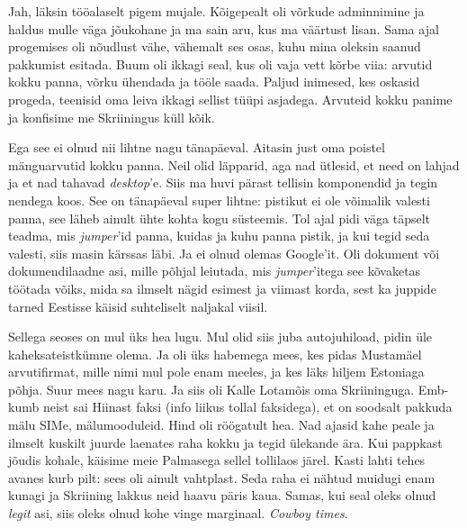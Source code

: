 
Jah, läksin tööalaselt 
pigem mujale. Kõigepealt oli võrkude adminnimine ja haldus mulle väga jõukohane ja ma sain aru, kus ma väärtust lisan. Sama ajal 
progemises oli nõudlust vähe, vähemalt ses osas, 
kuhu mina oleksin saanud pakkumist esitada. Buum oli ikkagi seal, kus 
oli vaja vett kõrbe viia: arvutid kokku panna, võrku ühendada ja
tööle saada. Paljud inimesed, kes 
oskasid progeda, teenisid oma leiva ikkagi sellist tüüpi asjadega. 
Arvuteid kokku panime ja konfisime me Skriiningus küll kõik. 

Ega see ei olnud nii lihtne nagu tänapäeval. Aitasin just oma poistel mänguarvutid kokku panna. 
Neil olid läpparid, aga nad ütlesid, et need on lahjad ja et nad tahavad \emph{desktop}'e. 
Siis ma huvi pärast tellisin komponendid ja tegin nendega koos. See on 
tänapäeval super lihtne: pistikut ei ole võimalik valesti 
panna, see läheb ainult ühte kohta kogu süsteemis. Tol ajal pidi väga 
täpselt teadma, mis \emph{jumper}'id panna, kuidas ja kuhu panna pistik, ja kui 
tegid seda valesti, siis masin kärssas läbi. Ja ei olnud olemas 
Google'it. Oli dokument või dokumendilaadne asi, mille põhjal leiutada, 
mis \emph{jumper}'itega see kõvaketas töötada võiks, mida sa ilmselt nägid 
esimest ja viimast korda, sest ka juppide tarned Eestisse käisid suhteliselt 
naljakal viisil. 


Sellega seoses on mul üks hea lugu. Mul olid siis juba autojuhiload, 
pidin üle kaheksateistkümne olema. Ja oli üks habemega 
mees, kes pidas Mustamäel arvutifirmat, mille nimi mul pole enam meeles, 
ja kes läks hiljem Estoniaga põhja. Suur mees nagu karu. 
Ja siis oli Kalle Lotamõis oma Skriininguga. Emb-kumb neist 
sai Hiinast faksi (info liikus tollal faksidega), et on soodsalt pakkuda mälu 
SIMe, mälumooduleid. Hind oli röögatult hea. Nad ajasid kahe peale ja ilmselt kuskilt juurde laenates raha kokku ja 
tegid ülekande ära. Kui pappkast jõudis kohale, käisime meie Palmasega sellel tollilaos järel. Kasti lahti tehes avanes kurb 
pilt: sees oli ainult 
vahtplast. Seda raha ei nähtud muidugi enam kunagi ja Skriining lakkus neid haavu päris kaua. Samas, kui seal oleks 
olnud \emph{legit} asi, siis oleks olnud kohe vinge marginaal. 
\emph{Cowboy times}. 


